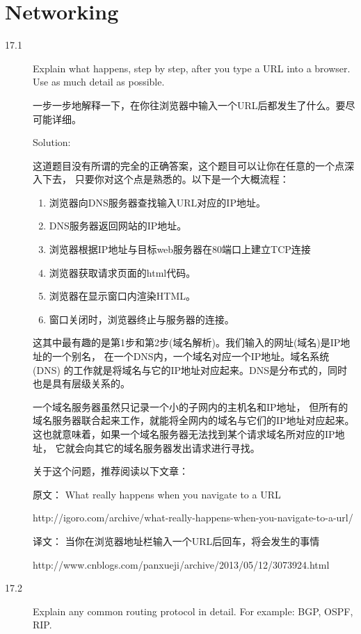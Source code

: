 \chapter{Networking}

\begin{description}
\item[17.1] Explain what happens, step by step, after you type a URL into a browser. Use as much detail as possible.



一步一步地解释一下，在你往浏览器中输入一个URL后都发生了什么。要尽可能详细。

  Solution:

  这道题目没有所谓的完全的正确答案，这个题目可以让你在任意的一个点深入下去， 只要你对这个点是熟悉的。以下是一个大概流程：
  \begin{enumerate}
  \item 浏览器向DNS服务器查找输入URL对应的IP地址。
  \item DNS服务器返回网站的IP地址。
  \item 浏览器根据IP地址与目标web服务器在80端口上建立TCP连接
  \item 浏览器获取请求页面的html代码。
  \item 浏览器在显示窗口内渲染HTML。
  \item 窗口关闭时，浏览器终止与服务器的连接。
  \end{enumerate}
  这其中最有趣的是第1步和第2步(域名解析)。我们输入的网址(域名)是IP地址的一个别名， 在一个DNS内，一个域名对应一个IP地址。域名系统(DNS) 的工作就是将域名与它的IP地址对应起来。DNS是分布式的，同时也是具有层级关系的。

  一个域名服务器虽然只记录一个小的子网内的主机名和IP地址， 但所有的域名服务器联合起来工作，就能将全网内的域名与它们的IP地址对应起来。 这也就意味着，如果一个域名服务器无法找到某个请求域名所对应的IP地址， 它就会向其它的域名服务器发出请求进行寻找。

  关于这个问题，推荐阅读以下文章：

  原文： What really happens when you navigate to a URL

  http://igoro.com/archive/what-really-happens-when-you-navigate-to-a-url/

  译文： 当你在浏览器地址栏输入一个URL后回车，将会发生的事情

  http://www.cnblogs.com/panxueji/archive/2013/05/12/3073924.html




\item[17.2] Explain any common routing protocol in detail. For example: BGP, OSPF, RIP.	


\end{description}
